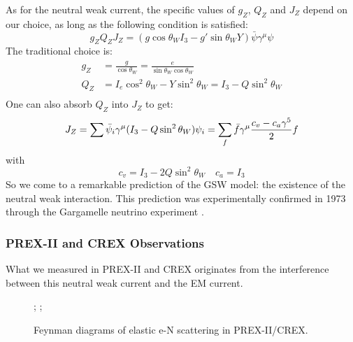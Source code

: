 As for the neutral weak current, the specific values of $g_Z$, $Q_Z$ and $J_Z$ 
depend on our choice, as long as the following condition is satisfied:
\begin{equation}
    g_Z Q_Z J_Z = (g\cos\theta_W I_3 - g'\sin\theta_W Y)\bar{\psi}\gamma^\mu\psi 
\end{equation}
The traditional choice is:
\begin{equation}
    \begin{aligned}
	g_Z &= \frac{g}{\cos\theta_W} = \frac{e}{\sin\theta_W\cos\theta_W}  \\
	Q_Z &= I_e\cos^2\theta_W - Y\sin^2\theta_W = I_3 - Q\sin^2\theta_W  \\
    \end{aligned}
\end{equation}
One can also absorb $Q_Z$ into $J_Z$ to get:
\begin{equation}
    J_Z = \sum \bar{\psi}_i\gamma^\mu (I_3 - Q\sin^2\theta_W)\psi_i
	= \sum_f \bar{f}\gamma^\mu\frac{c_v - c_a\gamma^5}{2} f \\
\end{equation}
with 
\begin{equation}
    c_v = I_3 - 2Q\sin^2\theta_W    \quad c_a = I_3
\end{equation}
So we come to a remarkable prediction of the GSW model: the existence of the 
neutral weak interaction. This prediction was experimentally confirmed in 1973 
through the Gargamelle neutrino experiment \cite{HASERT19741}.

\subsubsection{PREX-II and CREX Observations}
What we measured in PREX-II and CREX originates from the
interference between this neutral weak current and the EM current.

\begin{figure}[!h]
    \centering
{};
;
    \caption{Feynman diagrams of elastic e-N scattering in PREX-II/CREX.}
\end{figure}

